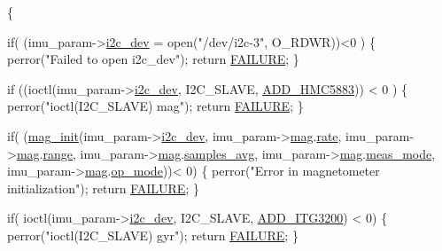 \begin{DoxyCode}
\{
  
  \textcolor{keywordflow}{if}( (imu\_param->\hyperlink{structIMU__PARAM__STRUCT_a8a870f383fc9ba0b682fdc9b8c0d2734}{i2c\_dev} = open(\textcolor{stringliteral}{"/dev/i2c-3"}, O\_RDWR))<0 )
  \{
    perror(\textcolor{stringliteral}{"Failed to open i2c\_dev"});
    \textcolor{keywordflow}{return} \hyperlink{calibration_2calibration_8h_a6d58f9ac447476b4e084d7ca383f5183}{FAILURE};
  \}

  \textcolor{keywordflow}{if} ((ioctl(imu\_param->\hyperlink{structIMU__PARAM__STRUCT_a8a870f383fc9ba0b682fdc9b8c0d2734}{i2c\_dev}, I2C\_SLAVE, \hyperlink{communication_2imu__functions_8h_a383c09d3e3bbe30097f7eb8d081fb856}{ADD\_HMC5883})) < 0
      ) \{
                perror(\textcolor{stringliteral}{"ioctl(I2C\_SLAVE) mag"});
                \textcolor{keywordflow}{return} \hyperlink{calibration_2calibration_8h_a6d58f9ac447476b4e084d7ca383f5183}{FAILURE};
  \}

  \textcolor{keywordflow}{if}( (\hyperlink{group__mag_ga014f908c9faa37c1ec75177a17012a01}{mag\_init}(imu\_param->\hyperlink{structIMU__PARAM__STRUCT_a8a870f383fc9ba0b682fdc9b8c0d2734}{i2c\_dev}, imu\_param->\hyperlink{structIMU__PARAM__STRUCT_a26b277dcaf05f3842995df888225f6f4}{mag}.\hyperlink{structIMU__PARAM__STRUCT_1_1param__mag_a234de95423b604b05b851ef90890cea1}{rate}, 
      imu\_param->\hyperlink{structIMU__PARAM__STRUCT_a26b277dcaf05f3842995df888225f6f4}{mag}.\hyperlink{structIMU__PARAM__STRUCT_1_1param__mag_a40ad27ebdb5fde35257b1dc52e40f476}{range}, imu\_param->\hyperlink{structIMU__PARAM__STRUCT_a26b277dcaf05f3842995df888225f6f4}{mag}.\hyperlink{structIMU__PARAM__STRUCT_1_1param__mag_a52c22cae6940eb39fb72aca66cfeba9a}{samples\_avg}, 
      imu\_param->\hyperlink{structIMU__PARAM__STRUCT_a26b277dcaf05f3842995df888225f6f4}{mag}.\hyperlink{structIMU__PARAM__STRUCT_1_1param__mag_a1f3536709c05310005d648f339d70c54}{meas\_mode}, imu\_param->\hyperlink{structIMU__PARAM__STRUCT_a26b277dcaf05f3842995df888225f6f4}{mag}.\hyperlink{structIMU__PARAM__STRUCT_1_1param__mag_a39b83b3e9ff5bdcafed0bdf6a2de584b}{op\_mode}))< 0)
  \{
      perror(\textcolor{stringliteral}{"Error in magnetometer initialization"});
      \textcolor{keywordflow}{return} \hyperlink{calibration_2calibration_8h_a6d58f9ac447476b4e084d7ca383f5183}{FAILURE};
  \}  

  \textcolor{keywordflow}{if}( ioctl(imu\_param->\hyperlink{structIMU__PARAM__STRUCT_a8a870f383fc9ba0b682fdc9b8c0d2734}{i2c\_dev}, I2C\_SLAVE, \hyperlink{communication_2imu__functions_8h_ab9fd1068a3f5fcba24d92918aaf0dcb5}{ADD\_ITG3200}) < 0) 
      \{
                perror(\textcolor{stringliteral}{"ioctl(I2C\_SLAVE) gyr"});
                \textcolor{keywordflow}{return} \hyperlink{calibration_2calibration_8h_a6d58f9ac447476b4e084d7ca383f5183}{FAILURE};
  \} 


\end{DoxyCode}
